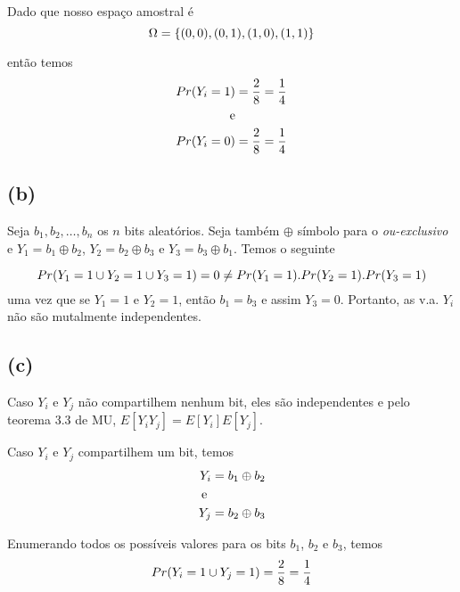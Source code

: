 \documentclass{article}
\begin{document}
Dado que nosso espaço amostral é
\begin{equation}
	\notag
	\Omega = \{(0,0), (0,1), (1,0), (1,1) \}
\end{equation}

então temos
\begin{equation}
	\notag
	\begin{split}
		Pr(Y_i = 1) &= \dfrac{2}{8} = \dfrac{1}{4}\\
		\text{e}&\\
		Pr(Y_i = 0) &= \dfrac{2}{8} = \dfrac{1}{4}
	\end{split}
\end{equation}

\subsection*{(b)}
Seja $b_1, b_2, \ldots , b_n$ os $n$ bits aleatórios. Seja também $\oplus$ símbolo
para o \emph{ou-exclusivo} e $Y_1 = b_1 \oplus b_2$, $Y_2 = b_2 \oplus b_3$ e $Y_3 = b_3 \oplus b_1$. Temos o seguinte

\begin{equation}
	\notag
	Pr(Y_1 = 1 \cup Y_2 = 1 \cup Y_3 = 1) = 0 \neq Pr(Y_1 = 1). Pr(Y_2 = 1). Pr(Y_3 = 1)
\end{equation}
uma vez que se $Y_1 = 1$ e $Y_2 = 1$, então $b_1 = b_3$ e assim $Y_3 = 0$. Portanto, as
v.a. $Y_i$ não são mutalmente independentes.

\subsection*{(c)}
Caso $Y_i$ e $Y_j$ não compartilhem nenhum bit, eles são independentes e pelo teorema 3.3 de MU, $E[Y_iY_j] = E[Y_i]E[Y_j]$.

Caso $Y_i$ e $Y_j$ compartilhem um bit, temos
\begin{equation}
	\notag
	\begin{split}
		Y_i &= b_1 \oplus b_2\\
		\text{ e }&\\
		Y_j &= b_2 \oplus b_3
	\end{split}
\end{equation}

Enumerando todos os possíveis valores para os bits $b_1$, $b_2$ e $b_3$, temos
\begin{equation}
	\notag
	Pr(Y_i = 1 \cup Y_j = 1) = \dfrac{2}{8} = \dfrac{1}{4}
\end{equation}
\end{document}
